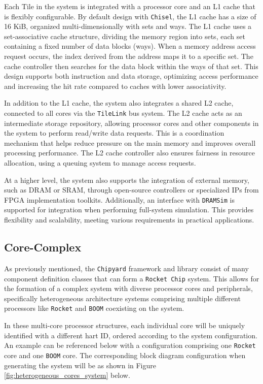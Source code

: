 Each Tile in the system is integrated with a processor core and an L1 cache that is flexibly configurable. By default design with \texttt{Chisel}, the L1 cache has a size of 16 KiB, organized multi-dimensionally with sets and ways. The L1 cache uses a set-associative cache structure, dividing the memory region into sets, each set containing a fixed number of data blocks (ways). When a memory address access request occurs, the index derived from the address maps it to a specific set. The cache controller then searches for the data block within the ways of that set. This design supports both instruction and data storage, optimizing access performance and increasing the hit rate compared to caches with lower associativity.

In addition to the L1 cache, the system also integrates a shared L2 cache, connected to all cores via the \texttt{TileLink} bus system. The L2 cache acts as an intermediate storage repository, allowing processor cores and other components in the system to perform read/write data requests. This is a coordination mechanism that helps reduce pressure on the main memory and improves overall processing performance. The L2 cache controller also ensures fairness in resource allocation, using a queuing system to manage access requests.

At a higher level, the system also supports the integration of external memory, such as DRAM or SRAM, through open-source controllers or specialized IPs from FPGA implementation toolkits. Additionally, an interface with \texttt{DRAMSim} is supported for integration when performing full-system simulation. This provides flexibility and scalability, meeting various requirements in practical applications.

\subsection{Core-Complex}
\label{subsec:core_complex}

As previously mentioned, the \texttt{Chipyard} framework and library consist of many component definition classes that can form a \texttt{Rocket Chip} system. This allows for the formation of a complex system with diverse processor cores and peripherals, specifically heterogeneous architecture systems comprising multiple different processors like \texttt{Rocket} and \texttt{BOOM} coexisting on the system.

In these multi-core processor structures, each individual core will be uniquely identified with a different hart ID, ordered according to the system configuration. An example can be referenced below with a configuration comprising one \texttt{Rocket} core and one \texttt{BOOM} core. The corresponding block diagram configuration when generating the system will be as shown in Figure \ref{fig:heterogeneous_cores_system} below.

